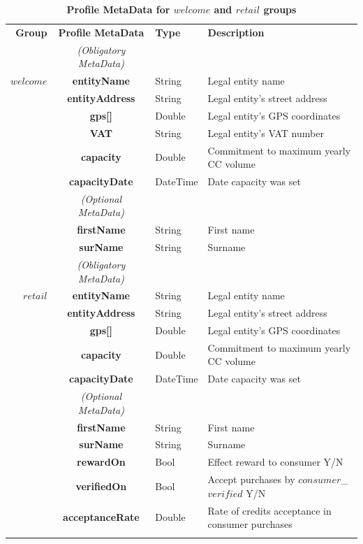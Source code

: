 \begin{table}[H]
\begin{centering}
\small
{
\begin{tabular}{ r | c | l | l }
\textbf{Group}	& {\bf Profile MetaData} & {\bf Type} & {\bf Description} \\
\Xhline{1.5pt}
			& \emph{(Obligatory MetaData)} & & \\
\cline{2-2}
$welcome$	& {\bf entityName}			&String	& Legal entity name \\
			& {\bf entityAddress}			&String	& Legal entity's street address \\
			& {\bf gps[]}				&Double	& Legal entity's GPS coordinates \\			
			& {\bf VAT}				&String	& Legal entity's VAT number \\
			& {\bf capacity}				&Double	& Commitment to maximum yearly CC volume \\
			& {\bf capacityDate}			&DateTime & Date capacity was set \\
\cline{2-2}
			 & \emph{(Optional MetaData)}& & \\
\cline{2-2}
			& {\bf firstName}			&String	& First name \\
			& {\bf surName}			&String	& Surname \\
\Xhline{1.5pt}
			& \emph{(Obligatory MetaData)} & & \\
\cline{2-2}
$retail$		& {\bf entityName}			&String	& Legal entity name \\
			& {\bf entityAddress}			&String	& Legal entity's street address \\
			& {\bf gps[]}				&Double	& Legal entity's GPS coordinates \\			
			& {\bf capacity}				&Double	& Commitment to maximum yearly CC volume \\
			& {\bf capacityDate}			&DateTime & Date capacity was set \\
\cline{2-2}
			 & \emph{(Optional MetaData)}& & \\
\cline{2-2}
			& {\bf firstName	}			&String	& First name \\
			& {\bf surName}			&String	& Surname \\
			& {\bf rewardOn}			&Bool	& Effect reward to consumer Y/N \\
			& {\bf verifiedOn}			&Bool	& Accept purchases by $consumer$\_$verified$ Y/N \\
			& {\bf acceptanceRate}		&Double	& Rate of credits acceptance in consumer purchases\\
\Xhline{1.5pt}
\end{tabular}
}
\caption{\small\textbf{Profile MetaData for $welcome$ and $retail$ groups}}
\label{tab:ProfileMetaData1}
\end{centering}
\end{table}



